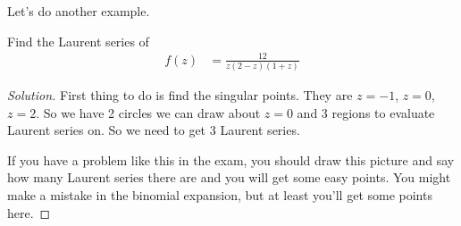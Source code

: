 Let's do another example.
\begin{example}
    Find the Laurent series of
    \begin{align}
        f(z) &= \frac{12}{z(2 - z)(1 + z)}
    \end{align}
\end{example}
\begin{proof}[Solution]
    First thing to do is find the singular points.
    They are $z=-1$, $z=0$, $z=2$.
    So we have 2 circles we can draw about $z=0$
    and 3 regions to evaluate Laurent series on.
    So we need to get 3 Laurent series.

    If you have a problem like this in the exam,
    you should draw this picture and say how many Laurent series there are and
    you will get some easy points.
    You might make a mistake in the binomial expansion,
    but at least you'll get some points here.


\end{proof}

